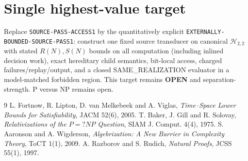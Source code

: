 \documentclass[11pt]{article}
\newcommand{\OPEN}{\textbf{OPEN}}
\begin{document}
\section{Single highest-value target}

Replace \texttt{SOURCE-PASS-ACCESS1} by the quantitatively explicit
\texttt{EXTERNALLY-BOUNDED-SOURCE-PASS1}: construct one fixed source
transducer on canonical $\mathcal H_{2,2}$ with stated $R(N),S(N)$ bounds on
all computation (including inlined decision work), exact hereditary child
semantics, bit-local access, charged failures/replay/output, and a closed
SAME\_REALIZATION evaluator in a model-matched forbidden region.  This target
remains \OPEN{} and separation-strength.  P versus NP remains open.

\begin{thebibliography}{9}
 L. Fortnow, R. Lipton, D. van Melkebeek and A. Viglas,
\emph{Time--Space Lower Bounds for Satisfiability}, JACM 52(6), 2005.
 T. Baker, J. Gill and R. Solovay,
\emph{Relativizations of the $P=?NP$ Question}, SIAM J. Comput. 4(4), 1975.
 S. Aaronson and A. Wigderson,
\emph{Algebrization: A New Barrier in Complexity Theory}, ToCT 1(1), 2009.
 A. Razborov and S. Rudich,
\emph{Natural Proofs}, JCSS 55(1), 1997.
\end{thebibliography}

\end{document}
